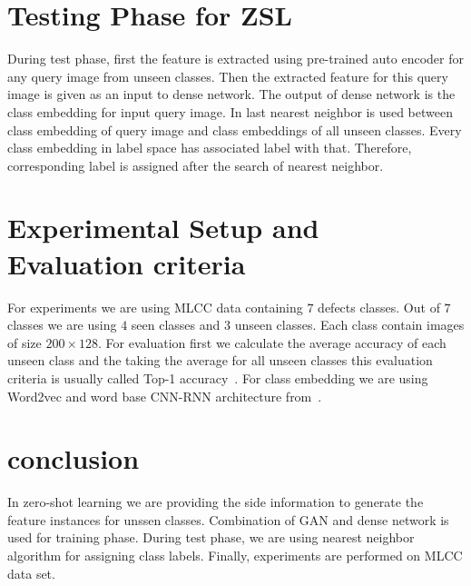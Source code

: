 \documentclass[11pt, conference, english]{IEEEtran}
\theoremstyle{plain}
\theoremstyle{definition}
\theoremstyle{remark}
\begin{document}
	\section{Testing Phase for ZSL}
	During test phase, first the feature is extracted using pre-trained auto encoder for any query image from unseen classes. Then the extracted feature for this query image is given as an input to dense network. The output of dense network is the class embedding for input query image. In last  nearest neighbor is used between class embedding of query image and class embeddings of all unseen classes. Every class embedding in label space has associated label with that. Therefore, corresponding label is assigned after the search of nearest neighbor.
	\section{Experimental Setup and Evaluation criteria}
	For experiments we are using MLCC data containing $7$ defects classes. Out of $7$ classes we are using $4$ seen classes and $3$ unseen classes. Each class contain images of size $200 \times 128$. For evaluation first we calculate the average accuracy of each unseen class and the taking the average for all unseen classes this evaluation criteria is usually called Top-1 accuracy~\cite{scott2016CVPR}. For class embedding we are using Word2vec and word base CNN-RNN architecture from~\cite{scott2016CVPR}.
	\section{conclusion}
	 In zero-shot learning we are providing the side information to generate the feature instances for unssen classes. Combination of GAN and dense network is used for training phase. During test phase, we are using nearest neighbor algorithm for assigning class labels. Finally, experiments are performed on MLCC data set.
		
	
\end{document}
